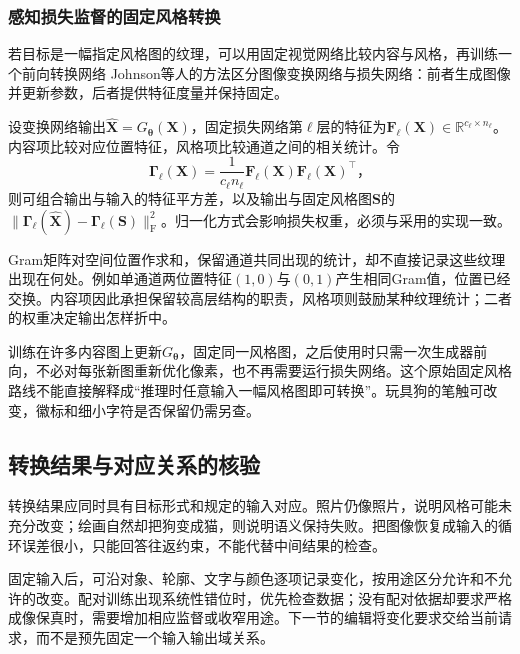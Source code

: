 \Needspace{45mm}
\subsubsection{感知损失监督的固定风格转换}
\label{sec:vision-generation-perceptual-style}

若目标是一幅指定风格图的纹理，可以用固定视觉网络比较内容与风格，再训练一个前向转换网络
Johnson等人的方法区分图像变换网络与损失网络：前者生成图像并更新参数，后者提供特征度量并保持固定。

设变换网络输出$\widehat{\bm{X}}=G_{\bm{\theta}}(\bm{X})$，固定损失网络第$\ell$层的特征为$\bm{F}_\ell(\bm{X})\in\mathbb{R}^{c_\ell\times n_\ell}$。内容项比较对应位置特征，风格项比较通道之间的相关统计。令
\begin{equation}
 \bm{\Gamma}_\ell(\bm{X})
 =\frac{1}{c_\ell n_\ell}
   \bm{F}_\ell(\bm{X})\bm{F}_\ell(\bm{X})^\top\text{，}
 \label{eq:vision-style-gram}
\end{equation}
则可组合输出与输入的特征平方差，以及输出与固定风格图$\bm{S}$的
$\lVert\bm{\Gamma}_\ell(\widehat{\bm{X}})-\bm{\Gamma}_\ell(\bm{S})\rVert_{\mathrm{F}}^2$。归一化方式会影响损失权重，必须与采用的实现一致。

Gram矩阵对空间位置作求和，保留通道共同出现的统计，却不直接记录这些纹理出现在何处。例如单通道两位置特征$(1,0)$与$(0,1)$产生相同Gram值，位置已经交换。内容项因此承担保留较高层结构的职责，风格项则鼓励某种纹理统计；二者的权重决定输出怎样折中。

训练在许多内容图上更新$G_{\bm{\theta}}$，固定同一风格图，之后使用时只需一次生成器前向，不必对每张新图重新优化像素，也不再需要运行损失网络。这个原始固定风格路线不能直接解释成“推理时任意输入一幅风格图即可转换”。玩具狗的笔触可改变，徽标和细小字符是否保留仍需另查。

\subsection{转换结果与对应关系的核验}
\label{sec:vision-generation-translation-check}

转换结果应同时具有目标形式和规定的输入对应。照片仍像照片，说明风格可能未充分改变；绘画自然却把狗变成猫，则说明语义保持失败。把图像恢复成输入的循环误差很小，只能回答往返约束，不能代替中间结果的检查。

固定输入后，可沿对象、轮廓、文字与颜色逐项记录变化，按用途区分允许和不允许的改变。配对训练出现系统性错位时，优先检查数据；没有配对依据却要求严格成像保真时，需要增加相应监督或收窄用途。下一节的编辑将变化要求交给当前请求，而不是预先固定一个输入输出域关系。

